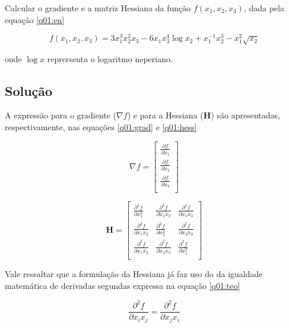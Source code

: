 \documentclass[10pt, a4paper]{article}
\begin{document}
Calcular o gradiente e a matriz Hessiana da função $f(x_1, x_2, x_3)$, dada pela equação \cref{q01:en}

\begin{equation}\label{q01:en}
  f(x_1, x_2, x_3) = 3x_1^3x_2^2x_3 - 6x_1x_3^4\log{x_2} + x_1^{-1}x_2^3 - x_1^2\sqrt{x_2}
\end{equation}

onde $\log{x}$ reprersenta o logaritmo neperiano.

\subsection[q01:solucao]{Solução}

A expressão para o gradiente ($\nabla f$) e para a Hessiana ($\mathbf{H}$) são apresentadas, respectivamente, nas equações \cref{q01:grad} e \cref{q01:hess}

\begin{equation}\label{q01:grad} 
  \nabla f =
  \left[ {\begin{array}{c}
    \frac{\partial f}{\partial x_1} \\
    \frac{\partial f}{\partial x_2} \\
    \frac{\partial f}{\partial x_3} \\
  \end{array} } \right]
\end{equation}

\begin{equation}\label{q01:hess} 
  \mathbf{H} =
  \left[ {\begin{array}{ccc}
    \frac{\partial^2 f}{\partial x_1^2} & \frac{\partial^2 f}{\partial x_1x_2} & \frac{\partial^2 f}{\partial x_1x_3} \\
    \frac{\partial^2 f}{\partial x_1x_2} & \frac{\partial^2 f}{\partial x_2^2} & \frac{\partial^2 f}{\partial x_2x_3} \\
    \frac{\partial^2 f}{\partial x_1x_3} & \frac{\partial^2 f}{\partial x_2x_3} & \frac{\partial^2 f}{\partial x_1^2} \\
  \end{array} } \right]
\end{equation}

Vale ressaltar que a formulação da Hessiana já faz uso do da igualdade matemática de derivadas segundas expressa na equação \cref{q01:teo}

\begin{equation}\label{q01:teo}
  \frac{\partial^2 f}{\partial x_i x_j} = \frac{\partial^2 f}{\partial x_j x_i}
\end{equation}
\end{document}
